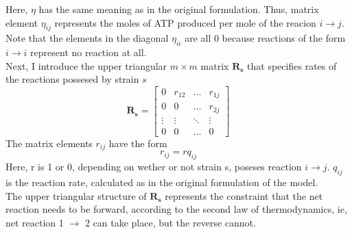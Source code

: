 \documentclass{article}
\begin{document}
		Here,  $ \eta $ has the same meaning as in the original formulation. Thus, matrix element $ \eta_{ij} $ represents the moles of ATP produced per mole of the reacion $ i \rightarrow j $. Note that the elements in the diagonal $ \eta_{ii} $ are all 0 because reactions of the form $ i \rightarrow i $  represent no reaction at all. \\
		Next, I introduce the upper triangular $ m \times m $   matrix $ \boldsymbol{R_s} $ that specifies rates of the reactions possesed by strain $ s $
			\[
			\boldsymbol{R_s}= \begin{bmatrix} 
			0 & r_{12} & \dots &  r_{1j} \\
			0 & 0 & \dots & r_{2j} \\
			\vdots &  \vdots & \ddots & \vdots \\
			0 & 0 & \dots & 0
			\end{bmatrix}
			\]
		The matrix elements $ r_{ij} $ have the form
		\begin{equation}
		r_{ij} = rq_{ij} 
		\end{equation}
		Here, r is 1 or 0, depending on wether or not strain s, poseses reaction $ i \rightarrow j $.  $ q_{ij} $ is the reaction rate, calculated as in the original formulation of the model.\\
		The upper triangular structure of $ \boldsymbol{R_s} $ represents the constraint that the net reaction needs to be forward, according to the second law of thermodynamics, ie, net reaction 1 $ \rightarrow $ 2 can take place, but the reverse cannot.\\
\end{document}
